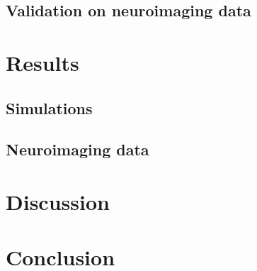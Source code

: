 \documentclass{article}
\theoremstyle{definition}
\begin{document}
\subsection{Validation on neuroimaging data}

\section{Results}

\subsection{Simulations}

\subsection{Neuroimaging data}

\section{Discussion}

\section{Conclusion}



  



\end{document}
